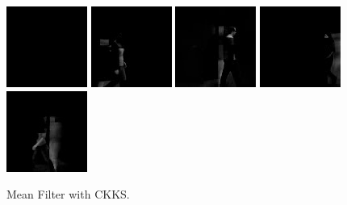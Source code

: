     \begin{subfigure}[t]{0.9\textwidth}
        \centering
        \includegraphics[scale=0.7]{figures/LASIESTA-CKKS-MEAN/frame0}
        \hfill
        \includegraphics[scale=0.7]{figures/LASIESTA-CKKS-MEAN/frame100}
        \hfill
        \includegraphics[scale=0.7]{figures/LASIESTA-CKKS-MEAN/frame190}
        \hfill
        \includegraphics[scale=0.7]{figures/LASIESTA-CKKS-MEAN/frame250}
        \hfill
        \includegraphics[scale=0.7]{figures/LASIESTA-CKKS-MEAN/frame270}
        \caption{Mean Filter with CKKS.}
    \end{subfigure}
    \\ \bigskip

